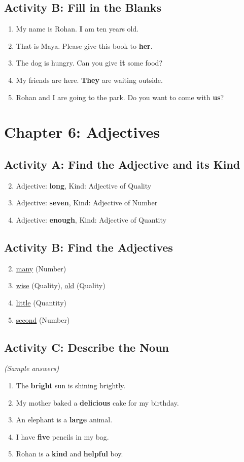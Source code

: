 \subsection*{Activity B: Fill in the Blanks}
\begin{enumerate}
    \item My name is Rohan. \textbf{I} am ten years old.
    \item That is Maya. Please give this book to \textbf{her}.
    \item The dog is hungry. Can you give \textbf{it} some food?
    \item My friends are here. \textbf{They} are waiting outside.
    \item Rohan and I are going to the park. Do you want to come with \textbf{us}?
\end{enumerate}

\section*{Chapter 6: Adjectives}
\subsection*{Activity A: Find the Adjective and its Kind}
\begin{enumerate}
    \setcounter{enumi}{1}
    \item Adjective: \textbf{long}, Kind: Adjective of Quality
    \item Adjective: \textbf{seven}, Kind: Adjective of Number
    \item Adjective: \textbf{enough}, Kind: Adjective of Quantity
\end{enumerate}
\subsection*{Activity B: Find the Adjectives}
\begin{enumerate}
    \setcounter{enumi}{1}
    \item \underline{many} (Number)
    \item \underline{wise} (Quality), \underline{old} (Quality)
    \item \underline{little} (Quantity)
    \item \underline{second} (Number)
\end{enumerate}
\subsection*{Activity C: Describe the Noun}
\textit{(Sample answers)}
\begin{enumerate}
    \item The \textbf{bright} sun is shining brightly.
    \item My mother baked a \textbf{delicious} cake for my birthday.
    \item An elephant is a \textbf{large} animal.
    \item I have \textbf{five} pencils in my bag.
    \item Rohan is a \textbf{kind} and \textbf{helpful} boy.
\end{enumerate}

